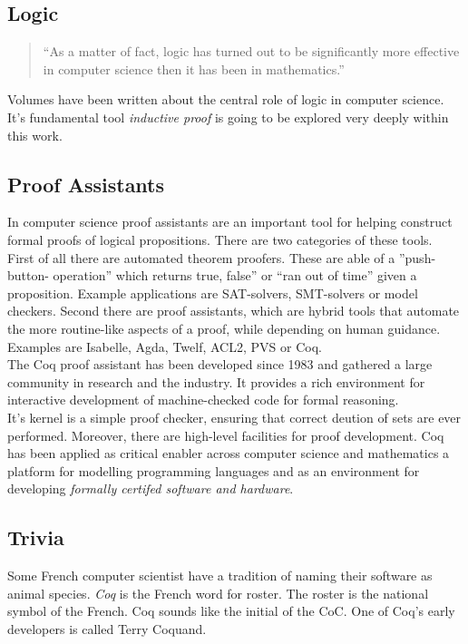 \subsection{Logic}

\begin{quote}
``As a matter of fact, logic has turned out to be significantly more effective in computer science then it has been in mathematics.''
\end{quote}
Volumes have been written about the central role of logic in computer science. 
It's fundamental tool {\itshape inductive proof} is going to be explored very deeply within this work.


\subsection{Proof Assistants}

In computer science proof assistants are an important tool for helping construct formal proofs of logical propositions.
There are two categories of these tools.\\
First of all there are automated theorem proofers. 
These are able of a ''push-button- operation'' which returns true, false'' or ``ran out of time'' given a proposition.
Example applications are \glspl{SAT-solver}, \glspl{SMT-solver} or \glspl{model checker}. 
Second there are proof assistants, which are hybrid tools that automate the more routine-like aspects of a proof, while depending on human guidance. 
Examples are \gls{Isabelle}, Agda, Twelf, ACL2, PVS or Coq.\\
The Coq proof assistant has been developed since 1983 and gathered a large community in research and the industry.
It provides a rich environment for interactive development of machine-checked code for formal reasoning.\\
It's kernel is a simple proof checker, ensuring that correct deution of sets are ever performed. 
Moreover, there are high-level facilities for proof development.
Coq has been applied as critical enabler across computer science and mathematics a platform for modelling programming languages and as an environment for developing {\itshape formally certifed software and hardware}.
 

\subsection{Trivia}

Some French computer scientist have a tradition of naming their software as animal species.
{\itshape Coq} is the French word for roster.
The roster is the national symbol of the French.
Coq sounds like the initial of the \gls{CoC}.
One of Coq's early developers is called Terry Coquand.


